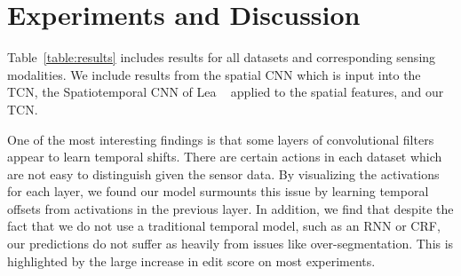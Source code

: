 \documentclass[10pt,twocolumn,letterpaper]{article}
\begin{document}


\section{Experiments and Discussion}
Table~\ref{table:results} includes results for all datasets and corresponding sensing modalities. We include results from the spatial CNN which is input into the TCN, the Spatiotemporal CNN of Lea \etal~\cite{lea_eccv_2016} applied to the spatial features, and our TCN.


One of the most interesting findings is that some layers of convolutional filters appear to learn temporal shifts. There are certain actions in each dataset which are not easy to distinguish given the sensor data. 
By visualizing the activations for each layer, we found our model surmounts this issue by learning temporal offsets from activations in the previous layer. 
In addition, we find that despite the fact that we do not use a traditional temporal model, such as an RNN or CRF, our predictions do not suffer as heavily from issues like over-segmentation. This is highlighted by the large increase in edit score on most experiments. 
\end{document}

